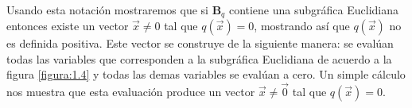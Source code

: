 \paragraph{}
Usando esta notación mostraremos que si $\textbf{B}_{q}$ contiene una subgráfica Euclidiana entonces existe un vector $\overrightarrow{x} \neq 0$ tal que $q\left(\overrightarrow{x}\right) = 0$, mostrando así que $q(\overrightarrow{x})$ no es definida positiva. Este vector se construye de la siguiente manera: se evalúan todas las variables que corresponden a la subgráfica Euclidiana de acuerdo a la figura \ref{figura:1.4} y todas las demas variables se evalúan a cero. Un simple cálculo nos muestra que esta evaluación produce un vector $\overrightarrow{x} \neq \overrightarrow{0}$ tal que $q\left(\overrightarrow{x}\right) = 0$.\\


